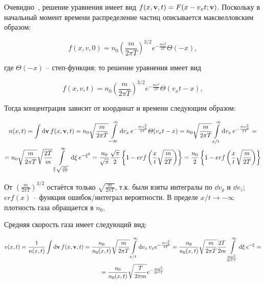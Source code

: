 \documentclass[10pt, a4paper]{article}
\begin{document}
Очевидно~\cite{silin}, решение уравнения имеет вид $f(x, \vb{v}, t) = F(x-v_xt; \vb{v})$. Поскольку в начальный момент времени распределение частиц описывается максвелловским образом:

\begin{equation*}
	f(x, v, 0) = n_0\left(\frac{m}{2\pi T}\right)^{3/2}e^{-\frac{mv^2}{2T}}\varTheta(-x),
\end{equation*}

где $\varTheta(-x)$ -- степ-функция; то решение уравнения имеет вид

\begin{equation*}
	f(x, v, t) = n_0\left(\frac{m}{2\pi T}\right)^{3/2}e^{-\frac{mv^2}{2T}}\varTheta(v_xt-x),
\end{equation*}

Тогда концентрация зависит от координат и времени следующим образом:

\begin{multline*}
	n(x, t) = \int\dd{\vb{v}}f(x, \vb{v}, t) = n_0\sqrt{\frac{m}{2\pi T}} \int\limits_{-\infty}^\infty \dd{v_x}e^{-\frac{mv_x^2}{2T}}\varTheta(v_xt-x) = n_0\sqrt{\frac{m}{2\pi T}} \int\limits_{x/t}^\infty \dd{v_x}e^{-\frac{mv_x^2}{2T}} = \\
	= n_0\sqrt{\frac{m}{2\pi T}} \sqrt{\frac{2T}{m}} \int\limits_{\frac{x}{t}\sqrt{\frac{m}{2T}}}^\infty\dd{\xi}e^{-\xi^2} = \frac{n_0}{\sqrt{\pi}}\frac{\sqrt{\pi}}{2}\left\lbrace 1-erf\left(\frac{x}{t}\sqrt{\frac{m}{2T}}\right) \right\rbrace = \frac{n_0}{2}\left\lbrace 1 - erf \left(\frac{x}{t} \sqrt{\frac{m}{2T}}\right) \right\rbrace
\end{multline*}

От $\left(\frac{m}{2\pi T}\right)^{3/2}$ остаётся только $\sqrt{\frac{m}{2\pi T}}$, т.к. были взяты интегралы по $\dd{v_y}$ и $\dd{v_z}$; $erf(x)$ -- функция ошибок/интеграл вероятности. В пределе $x/t\rightarrow-\infty$ плотность газа обращается в $n_0$.

Средняя скорость газа имеет следующий вид:

\begin{multline*}
	v(x, t) = \frac{1}{n(x, t)}\int\dd{\vb{v}}f(x, \vb{v}, t) = \frac{n_0}{n_0(x, t)}\sqrt{\frac{m}{2\pi T}}\int\limits_{x/t}^\infty\dd{v_x}v_xe^{-\frac{mv_x^2}{2T}} = \frac{n_0}{n_0(x, t)}\sqrt{\frac{m}{2\pi T}}\frac{2T}{2m} \int\limits_{\frac{mx^2}{2t^2T}}^\infty\dd{\xi}e^{-\xi} = \\
	= \frac{n_0}{n_0(x, t)}\sqrt{\frac{T}{2\pi m}}e^{-\frac{mx^2}{2t^2T}}
\end{multline*}
\end{document}
